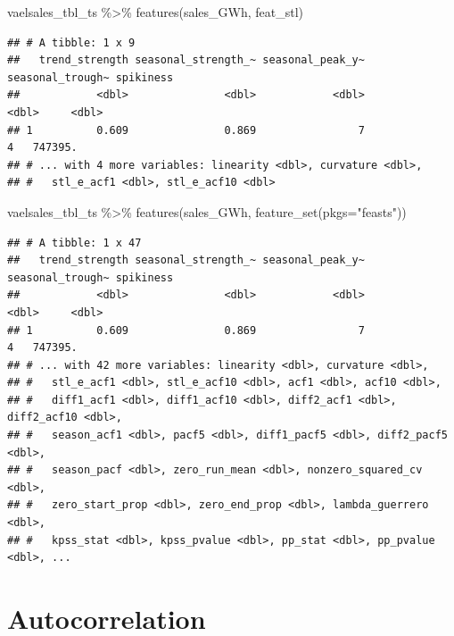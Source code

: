 \documentclass[
]{book}
\newenvironment{Shaded}{\begin{snugshade}}{\end{snugshade}}
\newcommand{\AttributeTok}[1]{\textcolor[rgb]{0.77,0.63,0.00}{#1}}
\newcommand{\FunctionTok}[1]{\textcolor[rgb]{0.00,0.00,0.00}{#1}}
\newcommand{\NormalTok}[1]{#1}
\newcommand{\SpecialCharTok}[1]{\textcolor[rgb]{0.00,0.00,0.00}{#1}}
\newcommand{\StringTok}[1]{\textcolor[rgb]{0.31,0.60,0.02}{#1}}
\begin{document}
\begin{Shaded}
\begin{Highlighting}[]
\NormalTok{vaelsales\_tbl\_ts }\SpecialCharTok{\%\textgreater{}\%}
  \FunctionTok{features}\NormalTok{(sales\_GWh, feat\_stl)}
\end{Highlighting}
\end{Shaded}

\begin{verbatim}
## # A tibble: 1 x 9
##   trend_strength seasonal_strength_~ seasonal_peak_y~ seasonal_trough~ spikiness
##            <dbl>               <dbl>            <dbl>            <dbl>     <dbl>
## 1          0.609               0.869                7                4   747395.
## # ... with 4 more variables: linearity <dbl>, curvature <dbl>,
## #   stl_e_acf1 <dbl>, stl_e_acf10 <dbl>
\end{verbatim}

\begin{Shaded}
\begin{Highlighting}[]
\NormalTok{vaelsales\_tbl\_ts }\SpecialCharTok{\%\textgreater{}\%}
  \FunctionTok{features}\NormalTok{(sales\_GWh, }\FunctionTok{feature\_set}\NormalTok{(}\AttributeTok{pkgs=}\StringTok{"feasts"}\NormalTok{))}
\end{Highlighting}
\end{Shaded}

\begin{verbatim}
## # A tibble: 1 x 47
##   trend_strength seasonal_strength_~ seasonal_peak_y~ seasonal_trough~ spikiness
##            <dbl>               <dbl>            <dbl>            <dbl>     <dbl>
## 1          0.609               0.869                7                4   747395.
## # ... with 42 more variables: linearity <dbl>, curvature <dbl>,
## #   stl_e_acf1 <dbl>, stl_e_acf10 <dbl>, acf1 <dbl>, acf10 <dbl>,
## #   diff1_acf1 <dbl>, diff1_acf10 <dbl>, diff2_acf1 <dbl>, diff2_acf10 <dbl>,
## #   season_acf1 <dbl>, pacf5 <dbl>, diff1_pacf5 <dbl>, diff2_pacf5 <dbl>,
## #   season_pacf <dbl>, zero_run_mean <dbl>, nonzero_squared_cv <dbl>,
## #   zero_start_prop <dbl>, zero_end_prop <dbl>, lambda_guerrero <dbl>,
## #   kpss_stat <dbl>, kpss_pvalue <dbl>, pp_stat <dbl>, pp_pvalue <dbl>, ...
\end{verbatim}

\hypertarget{autocorrelation}{%
\chapter{Autocorrelation}\label{autocorrelation}}
\end{document}
